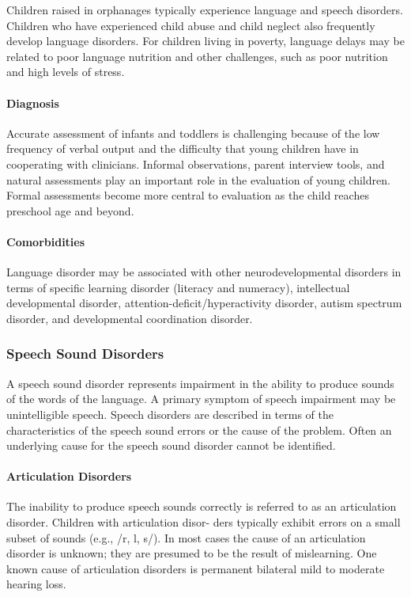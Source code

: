 Children raised in orphanages typically experience language and speech
disorders. Children who have experienced child abuse and child neglect also
frequently develop language disorders. For children living in poverty, language
delays may be related to poor language nutrition and other challenges, such as
poor nutrition and high levels of stress. \cite{Feldman44}

\paragraph{Diagnosis}
Accurate assessment of infants and toddlers is challenging because of the low
frequency of verbal output and the difficulty that young children have in
cooperating with clinicians. Informal observations, parent interview tools, and
natural assessments play an important role in the evaluation of young children.
Formal assessments become more central to evaluation as the child reaches
preschool age and beyond. \cite{Nelson53}

\paragraph{Comorbidities}
Language disorder may be associated with other neurodevelopmental disorders in
terms of specific learning disorder (literacy and numeracy), intellectual
developmental disorder, attention-deficit/hyperactivity disorder, autism
spectrum disorder, and developmental coordination disorder. \cite{Feldman44}

\subsubsection{Speech Sound Disorders}
A speech sound disorder represents impairment in the ability
to produce sounds of the words of the language. A primary
symptom of speech impairment may be unintelligible speech.
Speech disorders are described in terms of the characteristics
of the speech sound errors or the cause of the problem. Often
an underlying cause for the speech sound disorder cannot be
identified. \cite{Feldman44}

\paragraph{Articulation Disorders}
The inability to produce speech sounds correctly is referred to
as an articulation disorder. Children with articulation disor-
ders typically exhibit errors on a small subset of sounds (e.g., /r, l, s/). In
most cases the cause of an articulation disorder is
unknown; they are presumed to be the result of mislearning.
One known cause of articulation disorders is permanent
bilateral mild to moderate hearing loss. \cite{Feldman44}

